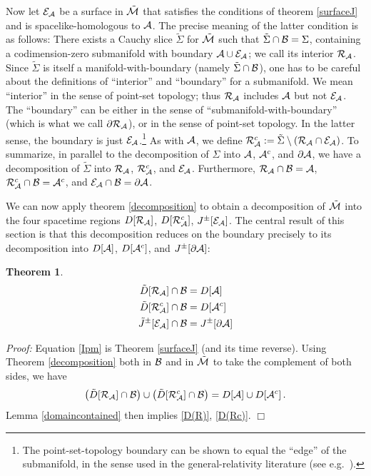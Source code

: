 \documentclass[12pt]{article}
\def\bulkD{{\tilde D}}
\def\bulkJ{{\tilde J}}
\def\bulk{{\cal M}}
\def\bdy{{\cal B}}
\def\overM{\tilde \bulk}
\def\regA{{\cal A}}
\def\regAc{{\cal A}^c}
\def\entsurf{
\partial \regA}
\def\domdA{D[\regA]}
\def\domdAc{D[\regAc]}
\def\extr{{\cal E}_\regA}
\def\homsurfA{{\cal R}_{\regA}}
\def\homsurfAc{{\cal R}_{\regA}^c}
\newtheorem{theorem}{Theorem}
\begin{document}
Now let $\extr$ be a surface in $\overM$ that satisfies the conditions of theorem \ref{surfaceJ} and is spacelike-homologous to $\regA$. The precise meaning of the latter condition is as follows: There exists a Cauchy slice $\tilde\Sigma$ for $\overM$ such that $\tilde\Sigma\cap\bdy=\Sigma$, containing a codimension-zero submanifold with boundary $\regA\cup\extr$; we call its interior $\homsurfA$. Since $\tilde\Sigma$ is itself a manifold-with-boundary (namely $\tilde\Sigma\cap\bdy$), one has to be careful about the definitions of ``interior'' and ``boundary'' for a submanifold. We mean ``interior'' in the sense of point-set topology; thus $\homsurfA$ includes $\regA$ but not $\extr$. The ``boundary'' can be either in the sense of ``submanifold-with-boundary'' (which is what we call $\partial\homsurfA$), or in the sense of point-set topology. In the latter sense, the boundary is just $\extr$.\footnote{ The point-set-topology boundary can be shown to equal the ``edge'' of the submanifold, in the sense used in the general-relativity literature (see e.g.\ \cite{Wald:1984ai}).} As with $\regA$, we define $\homsurfA^c:=\tilde\Sigma\setminus(\homsurfA\cap\extr)$. To summarize, in parallel to the decomposition of $\Sigma$ into $\regA$, $\regA^c$, and $\partial\regA$, we have a decomposition of $\tilde\Sigma$ into $\homsurfA$, $\homsurfA^c$, and $\extr$. Furthermore, $\homsurfA\cap\bdy=\regA$, $\homsurfA^c\cap\bdy=\regA^c$, and $\extr\cap\bdy=\partial\regA$.

We can now apply theorem \ref{decomposition} to obtain a decomposition of $\overM$ into the four spacetime regions $D[\homsurfA]$, $D[\homsurfA^c]$, $J^\pm[\extr]$. The central result of this section is that this decomposition reduces on the boundary precisely to its decomposition into $D[\regA]$, $D[\regA^c]$, and $J^\pm[\partial\regA]$:


\begin{theorem}\label{compatible}
%
\begin{subequations}
\begin{align}
\bulkD[\homsurfA] \cap\bdy&=\domdA
\label{D(R)}\\
\bulkD[\homsurfA^c]\cap\bdy&=\domdAc
\label{D(Rc)}\\
\bulkJ^\pm[\extr]\cap\bdy&=J^\pm[\entsurf]
\label{Ipm}
\end{align}
\end{subequations}
%
\end{theorem}
\emph{Proof:} Equation \eqref{Ipm} is Theorem \ref{surfaceJ} (and its time reverse). Using Theorem \ref{decomposition} both in $\bdy$ and in $\overM$ to take the complement of both sides, we have
%
\begin{equation}
\left(\bulkD[\homsurfA]\cap\bdy\right)\cup\left(\bulkD[\homsurfAc]\cap\bdy\right) = \domdA\cup \domdAc \,.
\end{equation}
%
Lemma \ref{domaincontained} then implies \eqref{D(R)}, \eqref{D(Rc)}. $\Box$\bigskip
\end{document}
